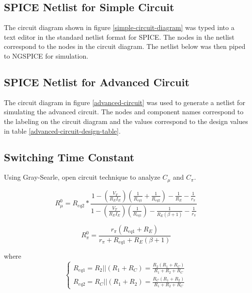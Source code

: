 \documentclass[titlepage, letterpaper, 10.5pt]{article}
\begin{document}
\clearpage
\subsection{SPICE Netlist for Simple Circuit}
\label{simple-circuit-netlist}

The circuit diagram shown in figure \ref{simple-circuit-diagram} was typed into a text editor
in the standard netlist format for SPICE. The nodes in the netlist correspond to the
nodes in the circuit diagram. The netlist below was then piped to NGSPICE for simulation.



\clearpage
\subsection{SPICE Netlist for Advanced Circuit}
\label{advanced-circuit-netlist}

The circuit diagram in figure \ref{advanced-circuit} was used to generate a netlist for
simulating the advanced circuit. The nodes and component names correspond to the labeling
on the circuit diagram and the values correspond to the design values in table
\ref{advanced-circuit-design-table}.



\subsection{Switching Time Constant}

Using Gray-Searle, open circuit technique to analyze $C_{\mu}$ and $C_{\pi}$.

\begin{equation}
R_{\mu}^{0}=R_{eq2}*\frac
{1-\left(\frac{V_{T}}{R_{E}I_{E}}\right) \left( \frac{1}{R_{eq1}}+\frac{1}{R_{eq2}}\right)-\frac{1}{R_{E}}-\frac{1}{r_{\pi}}}
{1-\left(\frac{V_{T}}{R_{E}I_{E}}\right) \left( \frac{1}{R_{eq1}} \right) -\frac{1}{R_{E}(\beta+1)}-\frac{1}{r_{\pi}}}
\end{equation}

\begin{equation}
R_{\pi}^{0}=\frac{r_{\pi}(R_{eq1}+R_{E})}{r_{\pi}+R_{eq1}+R_{E}(\beta+1)}
\end{equation}

where
\begin{equation}
\left\{\begin{array}{lr}
R_{eq1}=R_{2}||(R_{1}+R_{C})=\frac{R_{2}(R_{1}+R_{C})}{R_{1}+R_{2}+R_{C}}	\\
R_{eq2}=R_{C}||(R_{1}+R_{2})=\frac{R_{C}(R_{1}+R_{2})}{R_{1}+R_{2}+R_{C}}
\end{array}\right.
\end{equation}
\end{document}
